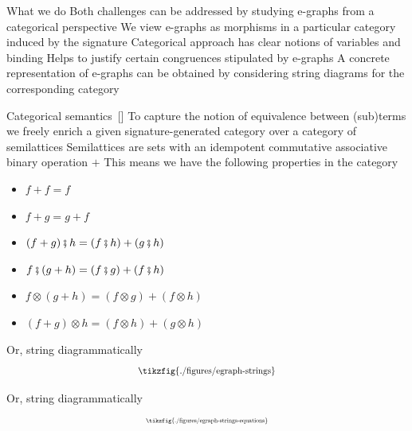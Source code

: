 \documentclass[aspectratio=169]{beamer}
\begin{document}
\begin{frame}{What we do}
Both challenges can be addressed by studying e-graphs from a \alert{categorical} perspective
\vfill
We view e-graphs as morphisms in a particular category induced by the signature
\vfill
Categorical approach has clear notions of variables and binding
\vfill
Helps to justify certain congruences stipulated by e-graphs
\vfill
A concrete representation of e-graphs can be obtained by considering \alert{string diagrams} for the corresponding category
\end{frame}
\begin{frame}{Categorical semantics~[\cite{tiurin2025equivalencehypergraphsdporewriting}]}
\vfill
To capture the notion of equivalence between (sub)terms we freely enrich a given signature-generated category over a category of semilattices
\vfill
Semilattices are sets with an idempotent commutative associative binary operation $+$
\vfill
This means we have the following properties in the category
\begin{itemize}
\item $f + f = f$
\item $f + g = g + f$
\item $(f + g) \fatsemi h = (f \fatsemi h) + (g \fatsemi h)$
\item $f \fatsemi (g + h) = (f \fatsemi g) + (f \fatsemi h)$
\item $f \otimes (g + h) = (f \otimes g) + (f \otimes h)$
\item $(f + g) \otimes h = (f \otimes h) + (g \otimes h)$
\end{itemize}
\vfill
\end{frame}

\begin{frame}{Or, string diagrammatically}
\[
\scalebox{0.8}{
\tikzfig{./figures/egraph-strings}
}
\]
\end{frame}


\begin{frame}{Or, string diagrammatically}
\[
\scalebox{0.55}{
\tikzfig{./figures/egraph-strings-equations}
}
\]
\end{frame}
\end{document}

